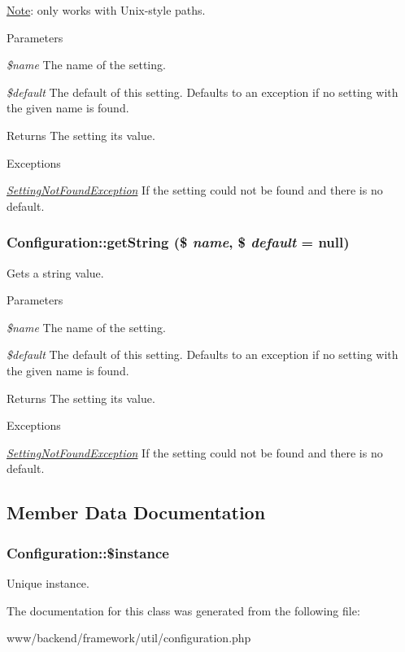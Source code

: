 \hyperlink{classNote}{Note}: only works with Unix-\/style paths.


\begin{DoxyParams}{Parameters}
\item[{\em \$name}]The name of the setting. \item[{\em \$default}]The default of this setting. Defaults to an exception if no setting with the given name is found.\end{DoxyParams}
\begin{DoxyReturn}{Returns}
The setting its value.
\end{DoxyReturn}

\begin{DoxyExceptions}{Exceptions}
\item[{\em \hyperlink{classSettingNotFoundException}{SettingNotFoundException}}]If the setting could not be found and there is no default. \end{DoxyExceptions}
\hypertarget{classConfiguration_af83327cbd2812c84077aa8e92cc1f9b6}{
\subsubsection[{getString}]{\setlength{\rightskip}{0pt plus 5cm}Configuration::getString (\$ {\em name}, \/  \$ {\em default} = {\ttfamily null})}}
\label{classConfiguration_af83327cbd2812c84077aa8e92cc1f9b6}
Gets a string value.


\begin{DoxyParams}{Parameters}
\item[{\em \$name}]The name of the setting. \item[{\em \$default}]The default of this setting. Defaults to an exception if no setting with the given name is found.\end{DoxyParams}
\begin{DoxyReturn}{Returns}
The setting its value.
\end{DoxyReturn}

\begin{DoxyExceptions}{Exceptions}
\item[{\em \hyperlink{classSettingNotFoundException}{SettingNotFoundException}}]If the setting could not be found and there is no default. \end{DoxyExceptions}


\subsection{Member Data Documentation}
\hypertarget{classConfiguration_a1f4b6d097ad7230a63eba874ddbc7bef}{
\subsubsection[{\$instance}]{\setlength{\rightskip}{0pt plus 5cm}Configuration::\$instance}}
\label{classConfiguration_a1f4b6d097ad7230a63eba874ddbc7bef}
Unique instance. 

The documentation for this class was generated from the following file:\begin{DoxyCompactItemize}
\item 
www/backend/framework/util/configuration.php\end{DoxyCompactItemize}
